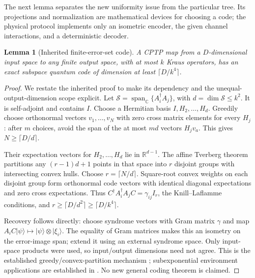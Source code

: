 \documentclass[11pt]{article}
\newtheorem{lemma}[theorem]{Lemma}
\newcommand{\ket}[1]{\lvert #1\rangle}
\begin{document}
The next lemma separates the new uniformity issue from the particular tree. Its projections and normalization are mathematical devices for choosing a code; the physical protocol implements only an isometric encoder, the given channel interactions, and a deterministic decoder.

\begin{lemma}[Inherited finite-error-set code]\label{lem:code}
A CPTP map from a $D$-dimensional input space to any finite output space, with at most $k$ Kraus operators, has an exact subspace quantum code of dimension at least $\lceil D/k^4\rceil$.
\end{lemma}
\begin{proof}
We restate the inherited proof to make its dependency and the unequal-output-dimension scope explicit. Let $\mathcal S=\operatorname{span}_{\mathbb C}\{A_i^\dagger A_j\}$, with $d=\dim\mathcal S\le k^2$. It is self-adjoint and contains $I$. Choose a Hermitian basis $I,H_2,\ldots,H_d$. Greedily choose orthonormal vectors $v_1,\ldots,v_N$ with zero cross matrix elements for every $H_j$: after $m$ choices, avoid the span of the at most $md$ vectors $H_jv_a$. This gives $N\ge\lceil D/d\rceil$.

Their expectation vectors for $H_2,\ldots,H_d$ lie in $\mathbb R^{d-1}$. The affine Tverberg theorem partitions any $(r-1)d+1$ points in that space into $r$ disjoint groups with intersecting convex hulls. Choose $r=\lceil N/d\rceil$. Square-root convex weights on each disjoint group form orthonormal code vectors with identical diagonal expectations and zero cross expectations. Thus $C^\dagger A_i^\dagger A_j C=\gamma_{ij}I_r$, the Knill--Laflamme conditions, and $r\ge\lceil D/d^2\rceil\ge\lceil D/k^4\rceil$.

Recovery follows directly: choose syndrome vectors with Gram matrix $\gamma$ and map $A_iC\ket\psi\mapsto\ket\psi\otimes\ket{\xi_i}$. The equality of Gram matrices makes this an isometry on the error-image span; extend it using an external syndrome space. Only input-space products were used, so input/output dimensions need not agree. This is the established greedy/convex-partition mechanism \cite{KLV,Tverberg}; subexponential environment applications are established in \cite{GBM}. No new general coding theorem is claimed.
\end{proof}
\end{document}
